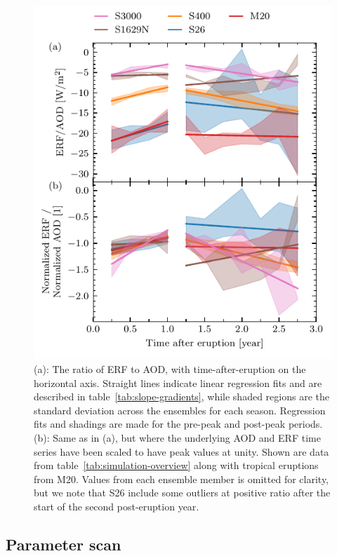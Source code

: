 \documentclass[draft]{agujournal2019}
\begin{document}
  \begin{figure}
    \centering \includegraphics{figure3}

    \caption{(a): The ratio of ERF to AOD, with time-after-eruption on the horizontal
      axis. Straight lines indicate linear regression fits and are described in
      table~\ref{tab:slope-gradients}, while shaded regions are the standard deviation
      across the ensembles for each season. Regression fits and shadings are made for
      the pre-peak and post-peak periods. (b): Same as in (a), but where the underlying
      AOD and ERF time series have been scaled to have peak values at unity. Shown are
      data from table~\ref{tab:simulation-overview} along with tropical eruptions from
      M20. Values from each ensemble member is omitted for clarity, but we note that S26
      include some outliers at positive ratio after the start of the second
      post-eruption year.}\label{fig:3_rf_to_aod_ratios}%
  \end{figure}

  \subsection{Parameter scan}
\end{document}
